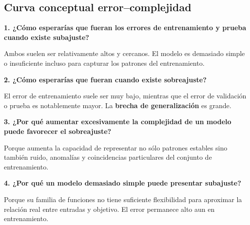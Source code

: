 \documentclass[11pt]{article}
\newcommand{\pregunta}[1]{\vspace{2mm}\textbf{#1}}
\begin{document}
\subsection*{Curva conceptual error--complejidad}
\begin{center}
\end{center}

\pregunta{1. ¿Cómo esperarías que fueran los errores de entrenamiento y prueba cuando existe subajuste?}
\begin{respuesta}
Ambos suelen ser relativamente altos y cercanos. El modelo es demasiado simple o insuficiente incluso para capturar los patrones del entrenamiento.
\end{respuesta}

\pregunta{2. ¿Cómo esperarías que fueran cuando existe sobreajuste?}
\begin{respuesta}
El error de entrenamiento suele ser muy bajo, mientras que el error de validación o prueba es notablemente mayor. La \textbf{brecha de generalización} es grande.
\end{respuesta}

\pregunta{3. ¿Por qué aumentar excesivamente la complejidad de un modelo puede favorecer el sobreajuste?}
\begin{respuesta}
Porque aumenta la capacidad de representar no sólo patrones estables sino también ruido, anomalías y coincidencias particulares del conjunto de entrenamiento.
\end{respuesta}

\pregunta{4. ¿Por qué un modelo demasiado simple puede presentar subajuste?}
\begin{respuesta}
Porque su familia de funciones no tiene suficiente flexibilidad para aproximar la relación real entre entradas y objetivo. El error permanece alto aun en entrenamiento.
\end{respuesta}
\end{document}
